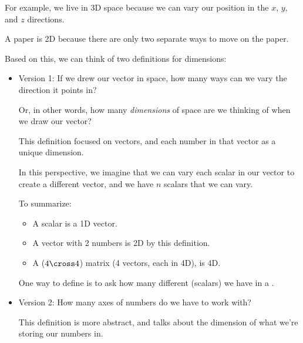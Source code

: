         For example, we live in 3D space because we can vary our position in the $x$, $y$, and $z$ directions.
        
        A paper is 2D because there are only two separate ways to move on the paper.
        
        Based on this, we can think of two definitions for dimensions:
        
        \begin{itemize}
            \item Version 1: If we drew our vector in space, how many ways can we vary the direction it points in?
            
            Or, in other words, how many \textit{dimensions} of space are we thinking of when we draw our vector?
            
            This definition focused on vectors, and each number in that vector as a unique dimension. 
            
            In this perspective, we imagine that we can vary each scalar in our vector to create a different vector, and we have $n$ scalars that we can vary.
            
            To summarize:
            
            \begin{itemize}
                \item A scalar is a 1D vector.
                
                \item A vector with 2 numbers is 2D by this definition. 
                
                \item A ($4 \cross 4$) matrix (4 vectors, each in 4D), is 4D.
            \end{itemize}
            
            
            \begin{definition}
                One way to define  is to ask how many different  (scalars) we have in a .
            \end{definition}
            
            
            \item Version 2: How many axes of numbers do we have to work with?
            
            This definition is more abstract, and talks about the dimension of what we're storing our numbers in. 
            

\end{itemize}
